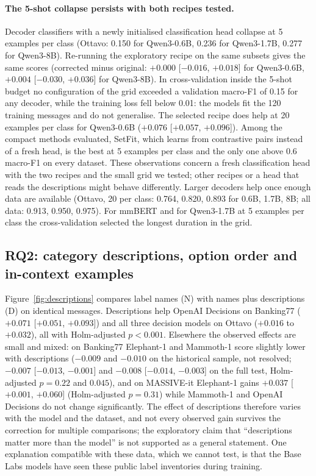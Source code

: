 \paragraph{The 5-shot collapse persists with both recipes tested.} Decoder classifiers with a newly initialised
classification head collapse at 5 examples per class (Ottavo: 0.150 for Qwen3-0.6B, 0.236 for Qwen3-1.7B, 0.277 for Qwen3-8B).
Re-running the exploratory recipe on the same subsets gives the same scores (corrected minus original: $+0.000$ [$-0.016$, $+0.018$]
for Qwen3-0.6B, $+0.004$ [$-0.030$, $+0.036$] for Qwen3-8B). In cross-validation inside the 5-shot budget no configuration of the grid
exceeded a validation macro-F1 of 0.15 for any decoder, while the training loss fell below 0.01: the models fit the 120 training
messages and do not generalise. The selected recipe does help at 20 examples per class for Qwen3-0.6B ($+0.076$ [$+0.057$, $+0.096$]).
Among the compact methods evaluated, SetFit, which learns from contrastive pairs instead of a fresh head, is the best at 5 examples per
class and the only one above 0.6 macro-F1 on every dataset. These observations concern a fresh classification head with the two recipes
and the small grid we tested; other recipes or a head that reads the descriptions might behave differently.
Larger decoders help once enough data are available (Ottavo, 20 per class: 0.764, 0.820, 0.893 for 0.6B, 1.7B, 8B; all data: 0.913,
0.950, 0.975). For mmBERT and for Qwen3-1.7B at 5 examples per class the cross-validation selected the longest duration in the grid.

\subsection{RQ2: category descriptions, option order and in-context examples}

Figure~\ref{fig:descriptions} compares label names (N) with names plus descriptions (D) on identical messages. Descriptions help
OpenAI Decisions on Banking77 ($+0.071$ [$+0.051$, $+0.093$]) and all three decision models on Ottavo ($+0.016$ to $+0.032$), all with
Holm-adjusted $p<0.001$. Elsewhere the observed effects are small and mixed: on Banking77 Elephant-1 and Mammoth-1 score slightly
lower with descriptions ($-0.009$ and $-0.010$ on the historical sample, not resolved; $-0.007$ [$-0.013$, $-0.001$] and $-0.008$
[$-0.014$, $-0.003$] on the full test, Holm-adjusted $p=0.22$ and $0.045$), and on MASSIVE-it Elephant-1 gains $+0.037$ [$+0.001$,
$+0.060$] (Holm-adjusted $p=0.31$) while Mammoth-1 and OpenAI Decisions do not change significantly. The effect of descriptions
therefore varies with the model and the dataset, and not every observed gain survives the correction for multiple comparisons; the exploratory claim that ``descriptions matter more than the model'' is not supported
as a general statement. One explanation compatible with these data, which we cannot test, is that the Base Labs models have seen these
public label inventories during training.

